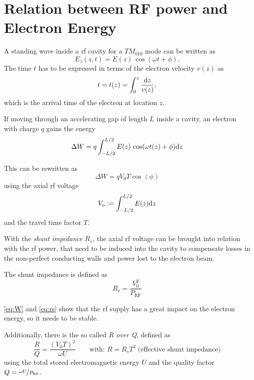 \section{Relation between RF power and Electron Energy}
A standing wave inside a \gls{rf} cavity for a $TM_{010}$ mode can be written as
\begin{equation}
E_z(z,t) = E(z)\,\cos(\omega t + \phi).
\end{equation}
The time $t$ has to be expressed in terms of the electron velocity $v(z)$ as
\begin{equation}
t=t(z)=\int_{0}^{z} \frac{\text{d}{z}}{v(z)},
\end{equation}
which is the arrival time of the electron at location $z$.

If moving through an accelerating gap of length $L$ inside a cavity, an electron with charge $q$ gains the energy
\begin{equation}
\Delta W = q \int_{-L/2}^{L/2} E(z)\,\cos(\omega t(z) + \phi) \text{d}{z}
\end{equation}

This can be rewritten as
\begin{equation}\label{eq:W}
\Delta W = q V_0 T \cos(\phi)
\end{equation}
using the axial \gls{rf} voltage
\begin{equation}
V_o := \int_{-L/2}^{L/2} E(z) \text{d}{z}
\end{equation}
and the travel time factor $T$. \cite[p.~32]{Wangler2008}

With the \textit{shunt impedance} $R_s$, the axial \gls{rf} voltage can be brought into relation with the \gls{rf} power, that need to be induced into the cavity to compensate losses in the non-perfect conducting walls and power lost to the electron beam. \cite{burtRF}

The shunt impedance is defined as
\begin{equation}\label{eq:rs}
R_s = \frac{V^2_0}{P_{\text{RF}}} 
\end{equation}

\autoref{eq:W} and \autoref{eq:rs} show that the \gls{rf} supply has a great impact on the electron energy, so it needs to be stable.

Additionally, there is the so called \textit{R over Q}, defined as
\begin{equation}
\frac{R}{Q} = \frac{(V_0T)^2}{\omega U}\qquad \text{with: }R=R_s T^2\;\text{(effective shunt impedance)}
\end{equation}
using the total stored electromagnetic energy $U$ and the quality factor $Q=\nicefrac{\omega U}{P_{\text{RF}}}$.

